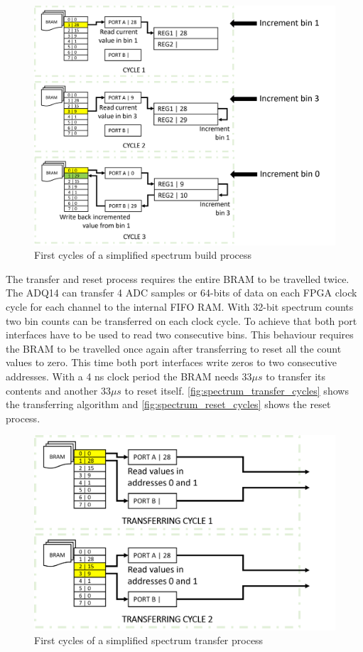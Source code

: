 \begin{figure}[H]
  \centering
  \includegraphics[width=\linewidth]{media/spectrum_build_cycles.png}
  \caption{First cycles of a simplified spectrum build process}
  \label{fig:spectrum_build_cycles} 
\end{figure}
The transfer and reset process requires the entire BRAM to be travelled twice. 
The ADQ14 can transfer 4 ADC samples or 64-bits of data
on each FPGA clock cycle for each channel to the internal FIFO RAM.
With 32-bit spectrum counts two bin counts can be transferred
on each clock cycle. To achieve that
both port interfaces have to be used to read two consecutive bins.
This behaviour requires the BRAM to be travelled once again after transferring
to reset all the count values to zero. This time both port interfaces
write zeros to two consecutive addresses. With a 4 ns clock period
the BRAM needs 33$\mu s$ to transfer its contents and another 33$\mu s$ to reset itself.
\autoref{fig:spectrum_transfer_cycles} shows the transferring algorithm and
\autoref{fig:spectrum_reset_cycles} shows the reset process.


\begin{figure}[H]
  \centering
  \includegraphics[width=\linewidth]{media/spectrum_transfer_cycles.png}
  \caption{First cycles of a simplified spectrum transfer process}
  \label{fig:spectrum_transfer_cycles} 
\end{figure}

